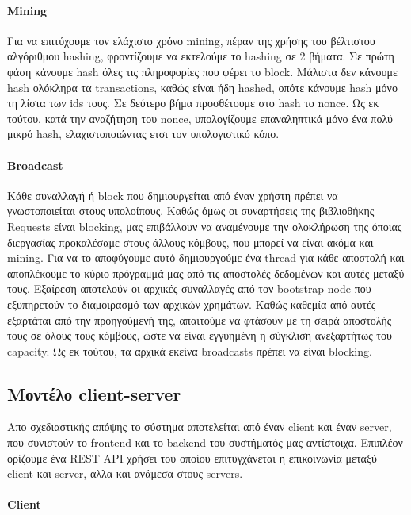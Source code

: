 \documentclass[titlepage]{article}
\begin{document}
\paragraph{Mining}

Για να επιτύχουμε τον ελάχιστο χρόνο mining, πέραν της χρήσης του βέλτιστου αλγόριθμου hashing, φροντίζουμε να εκτελούμε το hashing σε 2 βήματα. Σε πρώτη φάση κάνουμε hash όλες τις πληροφορίες που φέρει το block. Μάλιστα δεν κάνουμε hash ολόκληρα τα transactions, καθώς είναι ήδη hashed, οπότε κάνουμε hash μόνο τη λίστα των ids τους. Σε δεύτερο βήμα προσθέτουμε στο hash το nonce. Ως εκ τούτου, κατά την αναζήτηση του nonce, υπολογίζουμε επαναληπτικά μόνο ένα πολύ μικρό hash, ελαχιστοποιώντας ετσι τον υπολογιστικό κόπο.

\paragraph{Broadcast}

Κάθε συναλλαγή ή block που δημιουργείται από έναν χρήστη πρέπει να γνωστοποιείται στους υπολοίπους. Καθώς όμως οι συναρτήσεις της βιβλιοθήκης Requests είναι blocking, μας επιβάλλουν να αναμένουμε την ολοκλήρωση της όποιας διεργασίας προκαλέσαμε στους άλλους κόμβους, που μπορεί να είναι ακόμα και mining. Για να το αποφύγουμε αυτό δημιουργούμε ένα thread για κάθε αποστολή και αποπλέκουμε το κύριο πρόγραμμά μας από τις αποστολές δεδομένων και αυτές μεταξύ τους. Εξαίρεση αποτελούν οι αρχικές συναλλαγές από τον bootstrap node που εξυπηρετούν το διαμοιρασμό των αρχικών χρημάτων. Καθώς καθεμία από αυτές εξαρτάται από την προηγούμενή της, απαιτούμε να φτάσουν με τη σειρά αποστολής τους σε όλους τους κόμβους, ώστε να είναι εγγυημένη η σύγκλιση ανεξαρτήτως του capacity. Ως εκ τούτου, τα αρχικά εκείνα broadcasts πρέπει να είναι blocking.

\subsection{Μοντέλο client-server}

Απο σχεδιαστικής απόψης το σύστημα αποτελείται από έναν client και έναν server, που συνιστούν το frontend και το backend του συστήματός μας αντίστοιχα. Επιπλέον ορίζουμε ένα REST API χρήσει του οποίου επιτυγχάνεται η επικοινωνία μεταξύ client και server, αλλα και ανάμεσα στους servers.

\paragraph{Client}
\end{document}
